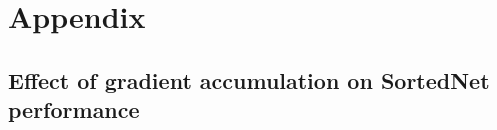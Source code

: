 \documentclass[letterpaper]{article} %
\begin{document}


% 

\clearpage
\newpage

\appendix

\section{Appendix}
\label{apdx:appendix}

\subsection{Effect of gradient accumulation on SortedNet performance}
\label{apdx:gradient-accumulation}
\end{document}
